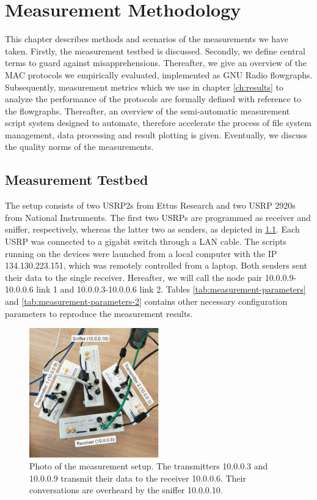 \chapter{Measurement Methodology}
\label{ch:methodology}

This chapter describes methods and scenarios of the measurements we have taken. Firstly, the measurement testbed is discussed. Secondly, we define central terms to guard against misapprehensions. Thereafter, we give an overview of the MAC protocols we empirically evaluated, implemented as GNU Radio flowgraphs. Subsequently, measurement metrics which we use in chapter \ref{ch:results} to analyze the performance of the protocols are formally defined with reference to the flowgraphs. Thereafter, an overview of the semi-automatic measurement script system designed to automate, therefore accelerate the process of file system management, data processing and result plotting is given. Eventually, we discuss the quality norms of the measurements.

\section{Measurement Testbed}

The setup consists of two USRP2s from Ettus Research and two USRP 2920s from National Instruments. The first two USRPs are programmed as receiver and sniffer, respectively, whereas the latter two as senders, as depicted in \ref{fig:measurement-setup}. Each USRP was connected to a gigabit switch through a LAN cable. The scripts running on the devices were launched from a local computer with the IP 134.130.223.151, which was remotely controlled from a laptop. Both senders sent their data to the single receiver. Hereafter, we will call the node pair 10.0.0.9-10.0.0.6 link 1 and 10.0.0.3-10.0.0.6 link 2. Tables \ref{tab:measurement-parameters} and \ref{tab:measurement-parameters-2}  contains other necessary configuration parameters to reproduce the measurement results.

\begin{figure}[tb]
	\label{fig:measurement-setup}
	\begin{center}
		\includegraphics[width=0.5\textwidth]{pictures/measurement_setup}
	\end{center}
	\caption{Photo of the measurement setup. The transmitters 10.0.0.3 and 10.0.0.9 transmit their data to the receiver 10.0.0.6. Their conversations are overheard by the sniffer 10.0.0.10.}
\end{figure}

